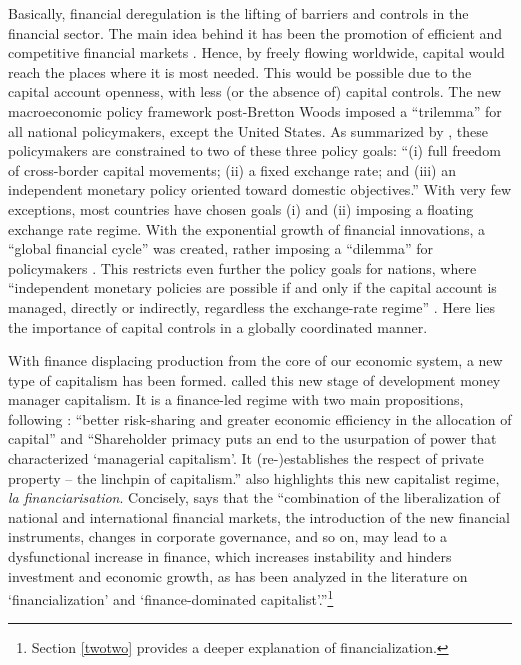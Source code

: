 \documentclass[a4paper, twoside]{templates/ociamthesis}
\begin{document}
Basically, financial deregulation is the lifting of barriers and controls in the financial sector. The main idea behind it has been the promotion of efficient and competitive financial markets \autocite{correa2015}. Hence, by freely flowing worldwide, capital would reach the places where it is most needed. This would be possible due to the capital account openness, with less (or the absence of) capital controls. The new macroeconomic policy framework post-Bretton Woods imposed a ``trilemma'' for all national policymakers, except the United States. As summarized by \textcite[ 30]{obstfeld2004}, these policymakers are constrained to two of these three policy goals: ``(i) full freedom of cross-border capital movements; (ii) a fixed exchange rate; and (iii) an independent monetary policy oriented toward domestic objectives.'' With very few exceptions, most countries have chosen goals (i) and (ii) imposing a floating exchange rate regime. With the exponential growth of financial innovations, a ``global financial cycle'' was created, rather imposing a ``dilemma'' for policymakers \autocite{rey2015}. This restricts even further the policy goals for nations, where ``independent monetary policies are possible if and only if the capital account is managed, directly or indirectly, regardless the exchange-rate regime'' \autocite[ 21]{rey2015}. Here lies the importance of capital controls in a globally coordinated manner.

With finance displacing production from the core of our economic system, a new type of capitalism has been formed. \textcite{minsky1996} called this new stage of development money manager capitalism. It is a finance-led regime with two main propositions, following \textcite[ xii]{aglietta2005}: ``better risk-sharing and greater economic efficiency in the allocation of capital'' and ``Shareholder primacy puts an end to the usurpation of power that characterized `managerial capitalism'. It (re-)establishes the respect of private property -- the linchpin of capitalism.'' \textcite{boyer2011} also highlights this new capitalist regime, \emph{la financiarisation}. Concisely, \textcite[ 182]{hein2015} says that the ``combination of the liberalization of national and international financial markets, the introduction of the new financial instruments, changes in corporate governance, and so on, may lead to a dysfunctional increase in finance, which increases instability and hinders investment and economic growth, as has been analyzed in the literature on `financialization' and `finance-dominated capitalist'.''\footnote{Section \ref{twotwo} provides a deeper explanation of financialization.}
\end{document}
